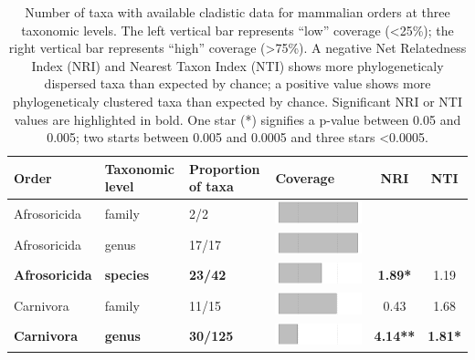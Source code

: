 \begin{longtable}{lL{1.8cm}C{2cm}lcc}
\caption{Number of taxa with available cladistic data for mammalian orders at three taxonomic levels. The left vertical bar represents ``low'' coverage (\textless 25\%); the right vertical bar represents ``high'' coverage (\textgreater 75\%). A negative Net Relatedness Index (NRI) and Nearest Taxon Index (NTI) shows more phylogeneticaly dispersed taxa than expected by chance; a positive value shows more phylogeneticaly clustered taxa than expected by chance. Significant NRI or NTI values are highlighted in bold. One star (*) signifies a p-value between 0.05 and 0.005; two starts between 0.005 and 0.0005 and three stars \textless 0.0005.} \\ 
  \hline
Order & Taxonomic level & Proportion of taxa & Coverage & NRI & NTI \\ 
  \hline
Afrosoricida & family & 2/2 & \includegraphics[width=0.20\linewidth, height=0.05\linewidth]{Missing_mammals/Table_figures/bar1.pdf} &   &   \\ 
  Afrosoricida & genus & 17/17 & \includegraphics[width=0.20\linewidth, height=0.05\linewidth]{Missing_mammals/Table_figures/bar2.pdf} &   &   \\ 
  \textbf{Afrosoricida} & \textbf{species} & \textbf{23/42} & \includegraphics[width=0.20\linewidth, height=0.05\linewidth]{Missing_mammals/Table_figures/bar3.pdf} & \textbf{1.89*} & 1.19 \\ 
  Carnivora & family & 11/15 & \includegraphics[width=0.20\linewidth, height=0.05\linewidth]{Missing_mammals/Table_figures/bar4.pdf} & 0.43 & 1.68 \\ 
  \textbf{Carnivora} & \textbf{genus} & \textbf{30/125} & \includegraphics[width=0.20\linewidth, height=0.05\linewidth]{Missing_mammals/Table_figures/bar5.pdf} & \textbf{4.14**} & \textbf{1.81*} \\ 

\end{longtable}
